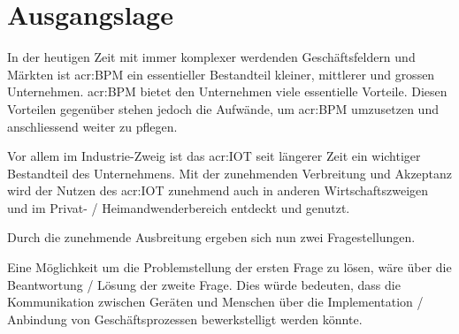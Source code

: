 
\chapter{Ausgangslage}

In der heutigen Zeit mit immer komplexer werdenden Geschäftsfeldern und Märkten ist \gls{acr:BPM} ein essentieller Bestandteil kleiner, mittlerer und grossen Unternehmen. \gls{acr:BPM} bietet den Unternehmen viele essentielle Vorteile. Diesen Vorteilen gegenüber stehen jedoch die Aufwände, um \gls{acr:BPM} umzusetzen und anschliessend weiter zu pflegen.

Vor allem im Industrie-Zweig ist das \gls{acr:IOT} seit längerer Zeit ein wichtiger Bestandteil des Unternehmens. Mit der zunehmenden Verbreitung und Akzeptanz wird der Nutzen des \gls{acr:IOT} zunehmend auch in anderen Wirtschaftszweigen und im Privat- / Heimandwenderbereich entdeckt und genutzt.

Durch die zunehmende Ausbreitung ergeben sich nun zwei Fragestellungen.

\begin{itemize}
\end{itemize}

Eine Möglichkeit um die Problemstellung der ersten Frage zu lösen, wäre über die Beantwortung / Lösung der zweite Frage. Dies würde bedeuten, dass die Kommunikation zwischen Geräten und Menschen über die Implementation / Anbindung von Geschäftsprozessen bewerkstelligt werden könnte.

